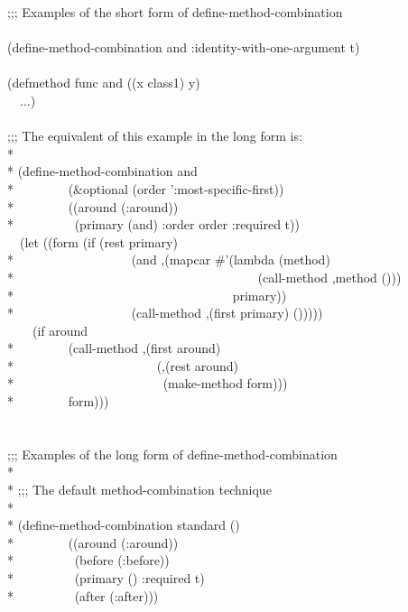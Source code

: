 \begin{defmac}
\begin{lisp}
;;; Examples of the short form of define-method-combination \\
\\
(define-method-combination and :identity-with-one-argument t) \\
\\
(defmethod func and ((x class1) y) \\
~~...) \\
\\
;;; The equivalent of this example in the long form is: \\*
\\*
(define-method-combination and \\*
~~~~~~~~(\&optional (order ':most-specific-first)) \\*
~~~~~~~~((around (:around)) \\*
~~~~~~~~~(primary (and) :order order :required t)) \\
~~(let ((form (if (rest primary) \\*
~~~~~~~~~~~~~~~~~~{\Xbq}(and ,{\Xatsign}(mapcar \#'(lambda (method) \\*
~~~~~~~~~~~~~~~~~~~~~~~~~~~~~~~~~~~~~~{\Xbq}(call-method ,method ())) \\*
~~~~~~~~~~~~~~~~~~~~~~~~~~~~~~~~~~primary)) \\*
~~~~~~~~~~~~~~~~~~{\Xbq}(call-method ,(first primary) ())))) \\
~~~~(if around \\*
~~~~~~~~{\Xbq}(call-method ,(first around) \\*
~~~~~~~~~~~~~~~~~~~~~~(,{\Xatsign}(rest around) \\*
~~~~~~~~~~~~~~~~~~~~~~~(make-method form))) \\*
~~~~~~~~form))) \\
\\
\\
;;; Examples of the long form of define-method-combination \\*
\\*
;;; The default method-combination technique \\*
\\*
(define-method-combination standard () \\*
~~~~~~~~((around (:around)) \\*
~~~~~~~~~(before (:before)) \\*
~~~~~~~~~(primary () :required t) \\*
~~~~~~~~~(after (:after))) \\

\end{lisp}
\end{defmac}

